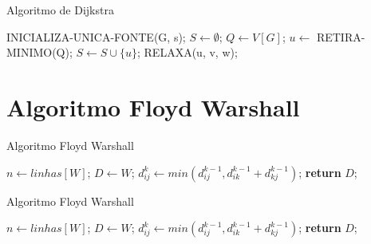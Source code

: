 \documentclass{beamer}
\begin{document}
	\begin{frame}{Algoritmo de Dijkstra}
		\begin{algorithm}[H]
			\caption{Dijkstra}\label{alg:d}
			\begin{algorithmic}[1]
				\State INICIALIZA-UNICA-FONTE(G, s);               
				\State $S\gets \emptyset$;
				\State $Q\gets V[G]$;
				                       
				\State $u\gets$ RETIRA-MINIMO(Q);               
				\State $S\gets S \cup \{u\}$;
				               
				\State RELAXA(u, v, w);
				\EndFor
				\EndWhile\label{euclidendwhile}
				\EndProcedure
			\end{algorithmic}
		\end{algorithm}
	\end{frame}
	
	
\section{Algoritmo Floyd Warshall}
	\begin{frame}{Algoritmo Floyd Warshall}
		\begin{algorithm}[H]
			\caption{Floyd-Warshall}\label{alg:fw}
			\begin{algorithmic}[1]
				\State $n \gets linhas[W]$;
				\State $D\gets W$;
				\State $d^k_{ij} \gets min(d^{k-1}_{ij}, d^{k-1}_{ik} + d^{k-1}_{kj})$;
				\EndFor
				\EndFor
				\EndFor
				\State \textbf{return} $D$;
				\EndProcedure
			\end{algorithmic}
		\end{algorithm}
	\end{frame}
	
	\begin{frame}{Algoritmo Floyd Warshall}
		\begin{algorithm}[H]
			\caption{Floyd-Warshall}\label{alg:fw}
			\begin{algorithmic}[1]
				\State $n \gets linhas[W]$;
				\State $D\gets W$;
				          
				\State $d^k_{ij} \gets min(d^{k-1}_{ij}, d^{k-1}_{ik} + d^{k-1}_{kj})$; 
				\EndFor
				\EndFor
				\EndFor
				\State \textbf{return} $D$;
				\EndProcedure
			\end{algorithmic}
		\end{algorithm}
	\end{frame}
	
\end{document}
